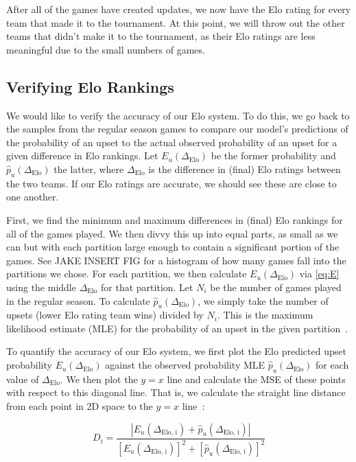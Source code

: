 \documentclass{article}
\begin{document}
After all of the games have created updates, we now have the Elo rating for every team that made it to the tournament. At this point, we will throw out the other teams that didn't make it to the tournament, as their Elo ratings are less meaningful due to the small numbers of games.

\subsection{Verifying Elo Rankings}\label{verify}
We would like to verify the accuracy of our Elo system. To do this, we go back to the samples from the regular season games to compare our model's predictions of the probability of an upset to the actual observed probability of an upset for a given difference in Elo rankings. Let $E_u(\Delta_{\text{Elo}})$ be the former probability and $\hat{p}_u(\Delta_{\text{Elo}})$ the latter, where $\Delta_{\text{Elo}}$ is the difference in (final) Elo ratings between the two teams. If our Elo ratings are accurate, we should see these are close to one another. 

First, we find the minimum and maximum differences in (final) Elo rankings for all of the games played. We then divvy this up into equal parts, as small as we can but with each partition large enough to contain a significant portion of the games. See JAKE INSERT FIG for a histogram of how many games fall into the partitions we chose. For each partition, we then calculate $E_u(\Delta_{\text{Elo}})$ via \autoref{eq:E} using the middle $\Delta_{\text{Elo}}$ for that partition. Let $N_i$ be the number of games played in the regular season. To calculate $\hat{p}_u(\Delta_{\text{Elo}})$, we simply take the number of upsets (lower Elo rating team wins) divided by $N_i$. This is the maximum likelihood estimate (MLE) for the probability of an upset in the given partition~\cite{statproofbookMaximumLikelihood}.

To quantify the accuracy of our Elo system, we first plot the Elo predicted upset probability $E_u(\Delta_{\text{Elo}})$ against the observed probability MLE $\hat{p}_u(\Delta_{\text{Elo}})$ for each value of $\Delta_{\text{Elo}}$. We then plot the $y=x$ line and calculate the MSE of these points with respect to this diagonal line. That is, we calculate the straight line distance from each point in 2D space to the $y=x$ line~\cite{enwiki:1235411332}:

\[
D_i = \frac{|E_u(\Delta_{\text{Elo, i}}) + \hat{p}_u(\Delta_{\text{Elo, i}})|}{{[E_u(\Delta_{\text{Elo, i}})]}^2+{[\hat{p}_u(\Delta_{\text{Elo, i}})]}^2}
\]
\end{document}
